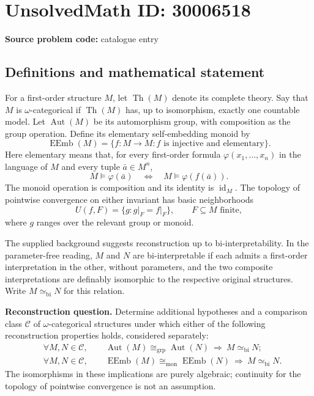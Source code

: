 \documentclass[11pt]{article}
\begin{document}
\section*{UnsolvedMath ID: 30006518}
\textbf{Source problem code:} catalogue entry
\subsection{Definitions and mathematical statement}
For a first-order structure \(M\), let \(\operatorname{Th}(M)\) denote its complete theory. Say that \(M\) is \(\omega\)-categorical if \(\operatorname{Th}(M)\) has, up to isomorphism, exactly one countable model. Let \(\operatorname{Aut}(M)\) be its automorphism group, with composition as the group operation. Define its elementary self-embedding monoid by
\[
\operatorname{EEmb}(M)=\{f:M\to M : f\text{ is injective and elementary}\}.
\]
Here elementary means that, for every first-order formula \(\varphi(x_1,\ldots,x_n)\) in the language of \(M\) and every tuple \(\bar a\in M^n\),
\[
M\models\varphi(\bar a)\quad\Longleftrightarrow\quad M\models\varphi(f(\bar a)).
\]
The monoid operation is composition and its identity is \(\operatorname{id}_M\). The topology of pointwise convergence on either invariant has basic neighborhoods
\[
U(f,F)=\{g:g\vert_F=f\vert_F\},\qquad F\subseteq M\text{ finite},
\]
where \(g\) ranges over the relevant group or monoid.

The supplied background suggests reconstruction up to bi-interpretability. In the parameter-free reading, \(M\) and \(N\) are bi-interpretable if each admits a first-order interpretation in the other, without parameters, and the two composite interpretations are definably isomorphic to the respective original structures. Write \(M\simeq_{\mathrm{bi}}N\) for this relation.

\textbf{Reconstruction question.} Determine additional hypotheses and a comparison class \(\mathcal C\) of \(\omega\)-categorical structures under which either of the following reconstruction properties holds, considered separately:
\[
\begin{aligned}
&\forall M,N\in\mathcal C,\qquad
\operatorname{Aut}(M)\cong_{\mathrm{grp}}\operatorname{Aut}(N)
\ \Longrightarrow\ M\simeq_{\mathrm{bi}}N;\\
&\forall M,N\in\mathcal C,\qquad
\operatorname{EEmb}(M)\cong_{\mathrm{mon}}\operatorname{EEmb}(N)
\ \Longrightarrow\ M\simeq_{\mathrm{bi}}N.
\end{aligned}
\]
The isomorphisms in these implications are purely algebraic; continuity for the topology of pointwise convergence is not an assumption.
\end{document}
